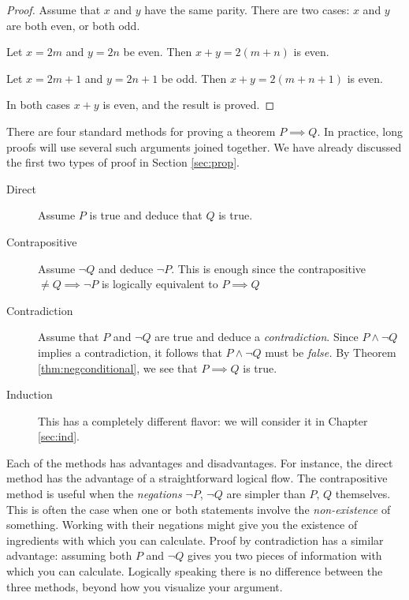 \begin{proof}
Assume that $x$ and $y$ have the same parity. There are two cases: $x$ and $y$ are both even, or both odd.
\begin{description}\setlength{\itemsep}{0pt}
  \item[Case 1:] Let $x=2m$ and $y=2n$ be even. Then $x+y=2(m+n)$ is even.
  \item[Case 2:] Let $x=2m+1$ and $y=2n+1$ be odd. Then $x+y=2(m+n+1)$ is even.
\end{description}
In both cases $x+y$ is even, and the result is proved.
\end{proof}

 


\clearpage





There are four standard methods for proving a theorem $P\implies Q$. In practice, long proofs will use several such arguments joined together. We have already discussed the first two types of proof in Section \ref{sec:prop}.

\begin{description}
	\item[Direct] Assume $P$ is true and deduce that $Q$ is true.
	\item[Contrapositive] Assume $\neg Q$ and deduce $\neg P$. This is enough since the contrapositive $\neq Q\implies\neg P$ is logically equivalent to $P\implies Q$
	\item[Contradiction] Assume that $P$ and $\neg Q$ are true and deduce a \emph{contradiction}. Since $P\wedge\neg Q$ implies a contradiction, it follows that $P\wedge\neg Q$ must be \emph{false.} By Theorem \ref{thm:negconditional}, we see that $P\implies Q$ is true.
	\item[Induction] This has a completely different flavor: we will consider it in Chapter \ref{sec:ind}.
\end{description}

 Each of the methods has advantages and disadvantages. For instance, the direct method has the advantage of a straightforward logical flow. The contrapositive method is useful when the \emph{negations} $\neg P$, $\neg Q$ are simpler than $P$, $Q$ themselves. This is often the case when one or both statements involve the \emph{non-existence} of something. Working with their negations might give you the existence of ingredients with which you can calculate. Proof by contradiction has a similar advantage: assuming both $P$ and $\neg Q$ gives you two pieces of information with which you can calculate. Logically speaking there is no difference between the three methods, beyond how you visualize your argument.\\

